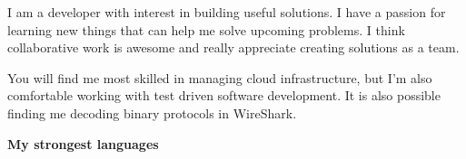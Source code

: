 \documentclass[9pt]{developercv} %
\begin{document}
\vspace{0.5cm}



\begin{minipage}[t]{0.4\textwidth} %
  \vspace{-\baselineskip} %

  I am a developer with interest in building useful solutions. I have a passion
  for learning new things that can help me solve upcoming problems.
  I think collaborative work is awesome and really appreciate creating
  solutions as a team.

  You will find me most skilled in managing cloud infrastructure, but I'm also
  comfortable working with test driven software development. It is also possible
  finding me decoding binary protocols in WireShark.
\end{minipage}
\hfill %
\begin{minipage}[t]{0.5\textwidth} %
  \vspace{-\baselineskip} %
  \textbf{My strongest languages}
  \begin{barchart}{5.5}
  \end{barchart}
\end{minipage}

\begin{center}
\end{center}


\end{document}
